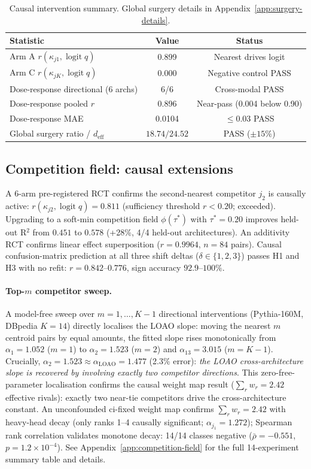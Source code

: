 \documentclass{article}
\DeclareMathOperator{\logit}{logit}
\begin{document}
\begin{table}[t]
\centering
\caption{Causal intervention summary. Global surgery details in Appendix~\ref{app:surgery-details}.}
\label{tab:causal}
\small
\begin{tabular}{lcc}
\toprule
Statistic & Value & Status \\
\midrule
Arm A $r(\kappa_{j1},\logit q)$ & 0.899 & Nearest drives logit \\
Arm C $r(\kappa_{jK},\logit q)$ & 0.000 & Negative control PASS \\
Dose-response directional (6 archs) & 6/6 & Cross-modal PASS \\
Dose-response pooled $r$ & 0.896 & Near-pass (0.004 below 0.90) \\
Dose-response MAE & 0.0104 & $\leq 0.03$ PASS \\
Global surgery ratio / $d_{\mathrm{eff}}$ & $18.74/24.52$ & PASS ($\pm15\%$) \\
\bottomrule
\end{tabular}
\end{table}

\subsection{Competition field: causal extensions}

A 6-arm pre-registered RCT confirms the second-nearest competitor $j_2$ is causally active:
$r(\kappa_{j2},\logit q)=0.811$ (sufficiency threshold $r<0.20$; exceeded).
Upgrading to a soft-min competition field $\phi(\tau^*)$ with $\tau^*=0.20$ improves
held-out R$^2$ from $0.451$ to $0.578$ (+28\%, 4/4 held-out architectures).
An additivity RCT confirms linear effect superposition ($r=0.9964$, $n=84$ pairs).
Causal confusion-matrix prediction at all three shift deltas ($\delta\in\{1,2,3\}$) passes
H1 and H3 with no refit: $r=0.842$--$0.776$, sign accuracy $92.9$--$100\%$.

\paragraph{Top-$m$ competitor sweep.}
A model-free sweep over $m=1,\ldots,K\!-\!1$ directional interventions (Pythia-160M, DBpedia $K=14$) directly localises the LOAO slope: moving the nearest $m$ centroid pairs by equal amounts, the fitted slope rises monotonically from $\alpha_1=1.052$ ($m=1$) to $\alpha_2=1.523$ ($m=2$) and $\alpha_{13}=3.015$ ($m=K\!-\!1$).
Crucially, $\alpha_2=1.523\approx\alpha_\mathrm{LOAO}=1.477$ (2.3\% error): \emph{the LOAO cross-architecture slope is recovered by involving exactly two competitor directions}.
This zero-free-parameter localisation confirms the causal weight map result ($\sum_r w_r=2.42$ effective rivals): exactly two near-tie competitors drive the cross-architecture constant.
An unconfounded ci-fixed weight map confirms $\sum_r w_r=2.42$ with heavy-head decay (only
ranks 1--4 causally significant; $\alpha_{j_1}=1.272$); Spearman rank correlation validates
monotone decay: 14/14 classes negative ($\bar\rho=-0.551$, $p=1.2\times10^{-4}$).
See Appendix~\ref{app:competition-field} for the full 14-experiment summary table and details.
\end{document}
